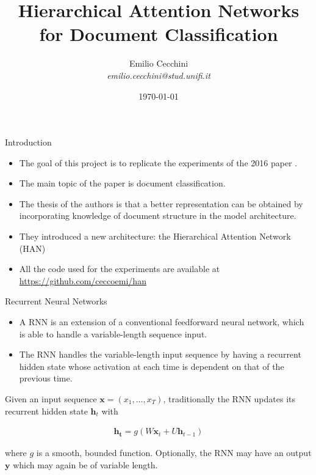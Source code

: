 \documentclass[10pt]{beamer}
\title{Hierarchical Attention Networks for Document Classification}
\date{\today}
\author{Emilio Cecchini \\ \textit{emilio.cecchini@stud.unifi.it}}
\institute{Università degli Studi di Firenze}
\begin{document}
\maketitle


\begin{frame}{Introduction}

\begin{itemize}
\item
The goal of this project is to replicate the experiments of the 2016 paper \cite{yang2016hierarchical}.
\item
The main topic of the paper is document classification.
\item
The thesis of the authors is that a better representation can be obtained by incorporating knowledge of document structure in the model architecture.
\item
They introduced a new architecture: the Hierarchical Attention Network (HAN)
\item
All the code used for the experiments are available at \url{https://github.com/ceccoemi/han}
\end{itemize}

\end{frame}


\begin{frame}{Recurrent Neural Networks}
\small{
\begin{itemize}
\item
A RNN is an extension of a conventional feedforward neural network, which is able to handle a variable-length sequence input.
\item
The RNN handles the variable-length input sequence by having a recurrent hidden state whose activation at each time is dependent on that of the previous time.
\end{itemize}

Given an input sequence $\mathbf{x}=\left(x_1, \dots, x_T\right)$, traditionally the RNN updates its recurrent hidden state $\mathbf{h}_t$ with

\begin{align}
\mathbf{h_t} = g\left(W\mathbf{x}_t + U\mathbf{h}_{t-1}\right)
\end{align}

where $g$ is a smooth, bounded function. Optionally, the RNN may have an output $\mathbf{y}$ which may again be of variable length.
}
\end{frame}
\end{document}
